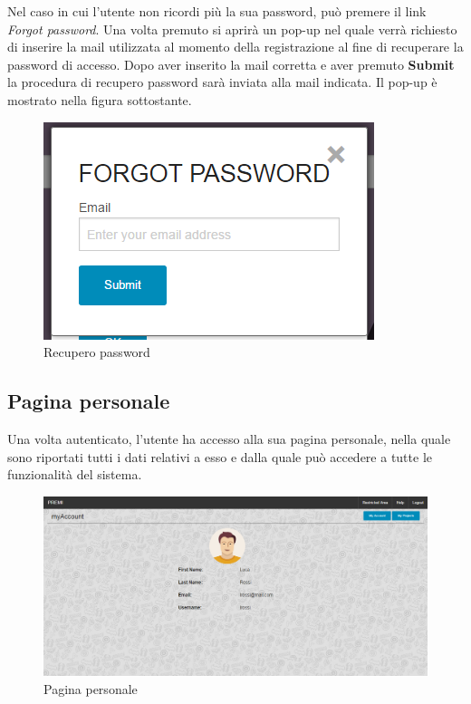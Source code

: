 \noindent Nel caso in cui l'utente non ricordi più la sua password, può premere il link \textit{Forgot password}. Una volta premuto si aprirà un pop-up nel quale verrà richiesto di inserire la mail utilizzata al momento della registrazione al fine di recuperare la password di accesso. Dopo aver inserito la mail corretta e aver premuto \textbf{Submit} la procedura di recupero password sarà inviata alla mail indicata. Il pop-up è mostrato nella figura sottostante.

\begin{figure}[H] 
	\centering 
	\includegraphics[scale=0.40] {img/forgot.png}
	\caption{Recupero password} 
\end{figure}

\subsection{Pagina personale}
Una volta autenticato, l'utente ha accesso alla sua pagina personale, nella quale sono riportati tutti i dati relativi a esso e dalla quale può accedere a tutte le funzionalità del sistema.

\begin{figure}[H] 
	\centering 
	\includegraphics[scale=0.40] {img/MyAccount.png}
	\caption{Pagina personale} 
\end{figure}


